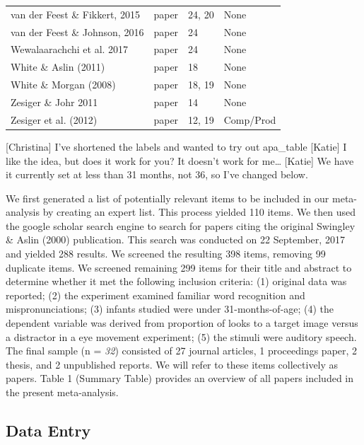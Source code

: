 \documentclass[man]{apa6}
\theoremstyle{definition}
\theoremstyle{definition}
\theoremstyle{definition}
\theoremstyle{remark}
\begin{document}
\begin{table}[tbp]
\begin{center}
\begin{threeparttable}
\begin{tabular}{llll}
van der Feest \& Fikkert, 2015 & paper & 24, 20 & None\\
van der Feest \& Johnson, 2016 & paper & 24 & None\\
Wewalaarachchi et al. 2017 & paper & 24 & None\\
White \& Aslin (2011) & paper & 18 & None\\
White \& Morgan (2008) & paper & 18, 19 & None\\
Zesiger \& Johr 2011 & paper & 14 & None\\
Zesiger et al. (2012) & paper & 12, 19 & Comp/Prod\\
\bottomrule
\end{tabular}
\end{threeparttable}
\end{center}
\end{table}

{[}Christina{]} I've shortened the labels and wanted to try out
apa\_table {[}Katie{]} I like the idea, but does it work for you? It
doesn't work for me\ldots{} {[}Katie{]} We have it currently set at less
than 31 months, not 36, so I've changed below.

We first generated a list of potentially relevant items to be included
in our meta-analysis by creating an expert list. This process yielded
110 items. We then used the google scholar search engine to search for
papers citing the original Swingley \& Aslin (2000) publication. This
search was conducted on 22 September, 2017 and yielded 288 results. We
screened the resulting 398 items, removing 99 duplicate items. We
screened remaining 299 items for their title and abstract to determine
whether it met the following inclusion criteria: (1) original data was
reported; (2) the experiment examined familiar word recognition and
mispronunciations; (3) infants studied were under 31-months-of-age; (4)
the dependent variable was derived from proportion of looks to a target
image versus a distractor in a eye movement experiment; (5) the stimuli
were auditory speech. The final sample (n = \emph{32}) consisted of 27
journal articles, 1 proceedings paper, 2 thesis, and 2 unpublished
reports. We will refer to these items collectively as papers. Table 1
(Summary Table) provides an overview of all papers included in the
present meta-analysis.

\subsection{Data Entry}\label{data-entry}
\end{document}
